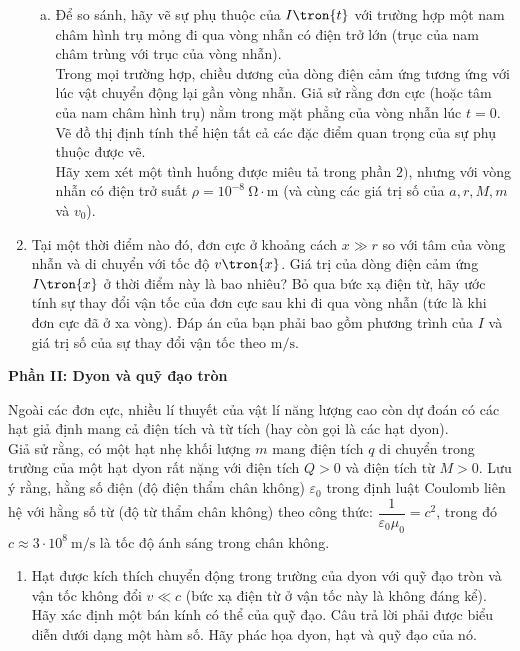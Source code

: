 \begin{vd}
\begin{enumerate}[1)]
\begin{enumerate}[a)]
        \item Để so sánh, hãy vẽ sự phụ thuộc của $I\tron{t}$ với trường hợp một nam châm hình trụ mỏng đi qua vòng nhẫn có điện trở lớn (trục của nam châm trùng với trục của vòng nhẫn).\\
        Trong mọi trường hợp, chiều dương của dòng điện cảm ứng tương ứng với lúc vật chuyển động lại gần vòng nhẫn. Giả sử rằng đơn cực (hoặc tâm của nam châm hình trụ) nằm trong mặt phẳng của vòng nhẫn lúc $t=0$. Vẽ đồ thị định tính thể hiện tất cả các đặc điểm quan trọng của sự phụ thuộc được vẽ.\\
        Hãy xem xét một tình huống được miêu tả trong phần $2)$, nhưng với vòng nhẫn có điện trở suất $\rho=10^{-8}~\mathrm{\Omega\cdot m}$ (và cùng các giá trị số của $a,r,M,m$ và $v_0$).
        \end{enumerate}
        \item Tại một thời điểm nào đó, đơn cực ở khoảng cách $x\gg r$ so với tâm của vòng nhẫn và di chuyển với tốc độ $v\tron{x}$. Giá trị của dòng điện cảm ứng $I\tron{x}$ ở thời điểm này là bao nhiêu? Bỏ qua bức xạ điện từ, hãy ước tính sự thay đổi vận tốc của đơn cực sau khi đi qua vòng nhẫn (tức là khi đơn cực đã ở xa vòng). Đáp án của bạn phải bao gồm phương trình của $I$ và giá trị số của sự thay đổi vận tốc theo $\mathrm{m/s}$.
    \end{enumerate}
\begin{center}
    \textbf{Phần II: Dyon và quỹ đạo tròn}
    \end{center}
    Ngoài các đơn cực, nhiều lí thuyết của vật lí năng lượng cao còn dự đoán có các hạt giả định mang cả điện tích và từ tích (hay còn gọi là các hạt dyon).\\
    Giả sử rằng, có một hạt nhẹ khối lượng $m$ mang điện tích $q$ di chuyển trong trường của một hạt dyon rất nặng với điện tích $Q>0$ và điện tích từ $M>0$. Lưu ý rằng, hằng số điện (độ điện thẩm chân không) $\varepsilon_0$ trong định luật Coulomb liên hệ với hằng số từ (độ từ thẩm chân không) theo công thức: $\dfrac{1}{\varepsilon_0\mu_0}=c^2$, trong đó $c\approx3\cdot10^8~\mathrm{m/s}$ là tốc độ ánh sáng trong chân không.
    \begin{enumerate}[1)]
        \item Hạt được kích thích chuyển động trong trường của dyon với quỹ đạo tròn và vận tốc không đổi $v\ll c$ (bức xạ điện từ ở vận tốc này là không đáng kể). Hãy xác định một bán kính có thể của quỹ đạo. Câu trả lời phải được biểu diễn dưới dạng một hàm số. Hãy phác họa dyon, hạt và quỹ đạo của nó.

\end{enumerate}
\end{vd}
